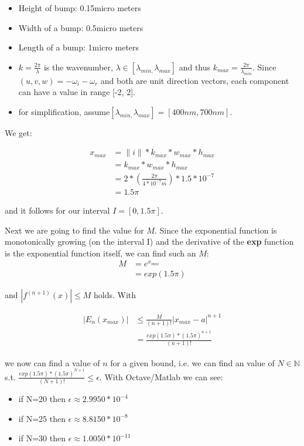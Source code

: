 \begin{itemize}
\item Height of bump: 0.15micro meters
\item Width of a bump: 0.5micro meters
\item Length of a bump: 1micro meters
\item $k=\frac{2\pi}{\lambda}$ is the wavenumber, $\lambda\in[\lambda_{min,}\lambda_{max}]$ and
thus $k_{max}=\frac{2\pi}{\lambda_{min}}$. Since $(u,v,w) = -\omega_i - \omega_r$ and both are unit direction vectors, 
each component can have a value in range {[}-2, 2{]}.
\item for simplification, assume$[\lambda_{min,}\lambda_{max}]=[400nm,700nm].$

\end{itemize}

We get:  

\begin{align}
x_{max}
 &= \|i\|*k_{max}*w_{max}*h_{max} \nonumber \\
 &= k_{max}*w_{max}*h_{max} \nonumber \\
 &=2*(\frac{2\pi}{4*10^{-7}m})*1.5*10^{-7} \nonumber \\
 &=1.5\pi
\end{align}

and it follows for our interval $I=[0,1.5\pi]$. 

Next we are going to find the value for $M$. Since the exponential function is monotonically growing (on the interval I) and the derivative of the \textbf{exp} function is the exponential function itself, we can find such an $M$: 
\begin{align*}
 M
 &=e^{x_{max}} \nonumber \\
 &=exp(1.5\pi)
\end{align*}

and $|f^{(n+1)}(x)|\leq M$ holds. With 

\begin{align}
|E_{n}(x_{max})|
 &\leq\frac{M}{(n+1)!}|x_{max}-a|^{n+1} \nonumber \\
 &= \frac{exp(1.5\pi)*(1.5\pi)^{n+1}}{(n+1)!}
\end{align}

we now can find a value of $n$ for a given bound, i.e. we can find an value of $N\mathbb{\in N}$ s.t. $\frac{exp(1.5\pi)*(1.5\pi)^{N+1}}{(N+1)!}\leq\epsilon$.
With Octave/Matlab we can see: 

\begin{itemize}
\item if N=20 then $\epsilon\approx2.9950*10^{-4}$
\item if N=25 then $\epsilon\approx8.8150*10^{-8}$
\item if N=30 then $\epsilon\approx1.0050*10^{-11}$
\end{itemize}

